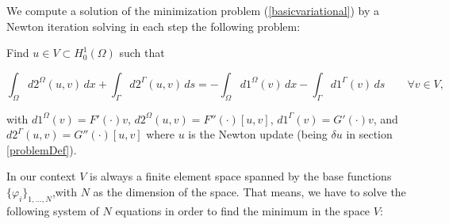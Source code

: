 \documentclass[11pt]{article}
\begin{document}
%
%
%
%
%
%
%
%
%
%
%
%

\noindent We compute a solution of the minimization problem (\ref{basicvariational}) by a Newton iteration solving in each step the following problem:

Find $u \in V \subset H_0^1(\Omega)$ such that 

\[
  \int_{\Omega} d2^{\Omega}(u,v) \, dx + \int_{\Gamma} d2^{\Gamma}(u,v) \, ds = 
  -\int_{\Omega} d1^{\Omega}(v) \,dx  - \int_{\Gamma} d1^{\Gamma}(v) \,ds \quad\quad \forall v \in V,
\]

\noindent with $d1^{\Omega}(v) = F'(\cdot)v$, $d2^{\Omega}(u,v) = F''(\cdot)[u,v]$, $d1^{\Gamma}(v) = G'(\cdot)v$, and $d2^{\Gamma}(u,v) = G''(\cdot)[u,v]$
where $u$ is the Newton update (being $\delta u$ in section \ref{problemDef}).

In our context $V$ is always a finite element space spanned by the base functions $\{\varphi_i\}_{1,\dots,N}$,with $N$ as the dimension of the space.
That means, we have to solve the following system of $N$ equations in order to find the minimum in the space $V$:
\end{document}
